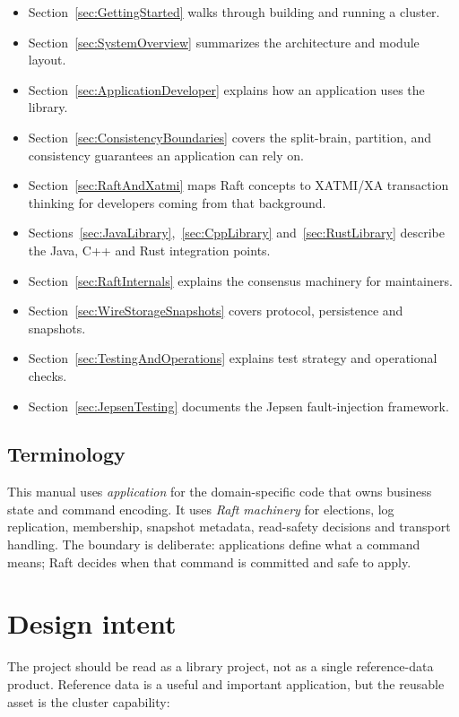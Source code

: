 \begin{itemize}
\item Section~\ref{sec:GettingStarted} walks through building and running a cluster.
\item Section~\ref{sec:SystemOverview} summarizes the architecture and module layout.
\item Section~\ref{sec:ApplicationDeveloper} explains how an application uses the library.
\item Section~\ref{sec:ConsistencyBoundaries} covers the split-brain, partition, and consistency guarantees an application can rely on.
\item Section~\ref{sec:RaftAndXatmi} maps Raft concepts to XATMI/XA transaction thinking for developers coming from that background.
\item Sections~\ref{sec:JavaLibrary},~\ref{sec:CppLibrary} and~\ref{sec:RustLibrary} describe the Java, C++ and Rust integration points.
\item Section~\ref{sec:RaftInternals} explains the consensus machinery for maintainers.
\item Section~\ref{sec:WireStorageSnapshots} covers protocol, persistence and snapshots.
\item Section~\ref{sec:TestingAndOperations} explains test strategy and operational checks.
\item Section~\ref{sec:JepsenTesting} documents the Jepsen fault-injection framework.
\end{itemize}

\subsection{Terminology}

This manual uses \emph{application} for the domain-specific code that owns
business state and command encoding. It uses \emph{Raft machinery} for elections,
log replication, membership, snapshot metadata, read-safety decisions and
transport handling. The boundary is deliberate: applications define what a
command means; Raft decides when that command is committed and safe to apply.

\section{Design intent}
\label{sec:DesignIntent}

The project should be read as a library project, not as a single reference-data
product. Reference data is a useful and important application, but the reusable
asset is the cluster capability:

